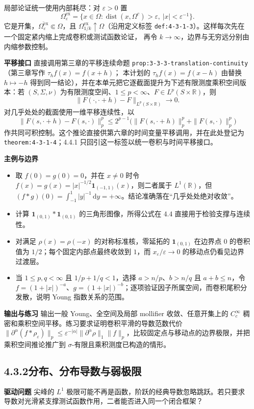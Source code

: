 \documentclass[11pt,a4paper]{ctexart}
\newcommand{\R}{\mathbb R}
\newcommand{\eps}{\varepsilon}
\newcommand{\dd}{\,\mathrm d}
\newcommand{\dist}{\operatorname{dist}}
\newcommand{\planitem}[1]{\par\smallskip\noindent\textcolor{deepblue}{\textbf{#1}}\quad}
\newcommand{\unithead}[2]{\subsection{#1\quad #2}}
\begin{document}
局部论证统一使用内部耗尽：对 $\eps>0$ 置
\[
 \Omega^{\mathrm{ex}}_\eps
 =\{x\in\Omega:\dist(x,\Omega^c)>\eps,\ |x|<\eps^{-1}\}.
\]
它是开集，$\overline{\Omega^{\mathrm{ex}}_\eps}\Subset\Omega$，且
$\Omega^{\mathrm{ex}}_{1/k}\uparrow\Omega$（沿用定义标签 \texttt{def:4-3-1-3}）。这样每次先在一个固定紧内缩上完成卷积或测试函数论证，
再令 $k\to\infty$，边界与无穷远分别由内缩参数控制。

\planitem{平移接口}
直接调用第三章的平移连续命题
\texttt{prop:3-3-3-translation-continuity}（第三章写作 $\tau_hf(x)=f(x+h)$；
本计划的 $\tau_hf(x)=f(x-h)$ 由替换 $h\mapsto-h$ 得到同一结论），并在本单元把它逐截面提升为下述有限测度乘积空间版本：若
$(S,\Sigma,\nu)$ 为有限测度空间、$1\le p<\infty$、$F\in L^p(S\times\R)$，则
\[
\|F(\cdot,\cdot+h)-F\|_{L^p(S\times\R)}\longrightarrow0.
\]
对几乎处处的截面使用一维平移连续性，以
\[
\|F(s,\cdot+h)-F(s,\cdot)\|_p^p
\le2^{p-1}\bigl(\|F(s,\cdot+h)\|_p^p+\|F(s,\cdot)\|_p^p\bigr)
\]
作共同可积控制。这个推论直接供第六章的时间变量平移调用，并在此处登记为
\texttt{theorem:4-3-1-4}；4.4.1 只回引这一标签以统一卷积与时间平移接口。

\planitem{主例与边界}
\begin{itemize}
\item 取 $f(0)=g(0)=0$，并在 $x\ne0$ 时令
$f(x)=g(x)=|x|^{-1/2}\mathbf1_{(-1,1)}(x)$，则二者属于 $L^1(\R)$，但
$(f*g)(0)=\int_{-1}^1|y|^{-1}\dd y=+\infty$。结论准确落在“几乎处处绝对收敛”。
\item 计算 $\mathbf1_{(0,1)}*\mathbf1_{(0,1)}$ 的三角形图像，所得公式在 4.4 直接用于检验支撑与连续性。
\item 对满足 $\rho(x)=\rho(-x)$ 的对称标准核，零延拓的 $\mathbf1_{(0,1)}$ 在边界点 $0$ 的卷积值为 $1/2$；每个固定内部点最终收敛到 $1$，而 $x_\eps/\eps\to0$ 的移动点仍看见边界过渡层。
\item 当 $1\le p,q<\infty$ 且 $1/p+1/q<1$，选择 $a>n/p$、$b>n/q$ 且 $a+b\le n$，令
$f=(1+|x|)^{-a}$、$g=(1+|x|)^{-b}$；逐项验证因子所属空间，而卷积尾积分发散，说明 Young 指数关系的范围。
\end{itemize}

\planitem{输出与练习}
输出一般 Young、全空间及局部 mollifier 收敛、任意开集上的 $C_c^\infty$ 稠密和乘积空间平移。练习要求证明卷积平滑的导数范数代价
$\|\partial^\alpha(f*\rho_\eps)\|_p\le
\eps^{-|\alpha|}\|\partial^\alpha\rho\|_1\|f\|_p$，比较固定点与移动点的边界极限，并把乘积空间推论推广到 $\sigma$-有限且乘积测度已构造的情形。

\unithead{4.3.2}{分布、分布导数与弱极限}

\planitem{驱动问题}
尖峰的 $L^1$ 极限可能不再是函数，阶跃的经典导数忽略跳跃。若只要求导数对光滑紧支撑测试函数作用，二者能否进入同一个闭合框架？
\end{document}
